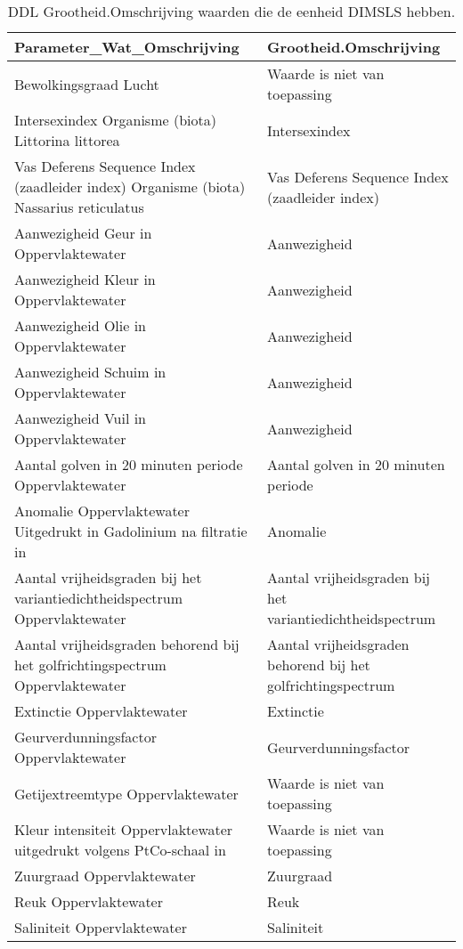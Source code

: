 \documentclass[
]{book}
\begin{document}
\begin{table}

\caption{\label{tab:DDL-DIMSLS}DDL Grootheid.Omschrijving waarden die de eenheid DIMSLS hebben. }
\centering
\begin{tabular}[t]{l|l}
\hline
Parameter\_Wat\_Omschrijving & Grootheid.Omschrijving\\
\hline
Bewolkingsgraad Lucht & Waarde is niet van toepassing\\
\hline
Intersexindex Organisme (biota) Littorina littorea & Intersexindex\\
\hline
Vas Deferens Sequence Index (zaadleider index) Organisme (biota) Nassarius reticulatus & Vas Deferens Sequence Index (zaadleider index)\\
\hline
Aanwezigheid Geur in Oppervlaktewater & Aanwezigheid\\
\hline
Aanwezigheid Kleur in Oppervlaktewater & Aanwezigheid\\
\hline
Aanwezigheid Olie in Oppervlaktewater & Aanwezigheid\\
\hline
Aanwezigheid Schuim in Oppervlaktewater & Aanwezigheid\\
\hline
Aanwezigheid Vuil in Oppervlaktewater & Aanwezigheid\\
\hline
Aantal golven in 20 minuten periode Oppervlaktewater & Aantal golven in 20 minuten periode\\
\hline
Anomalie Oppervlaktewater Uitgedrukt in Gadolinium na filtratie in & Anomalie\\
\hline
Aantal vrijheidsgraden bij het variantiedichtheidspectrum Oppervlaktewater & Aantal vrijheidsgraden bij het variantiedichtheidspectrum\\
\hline
Aantal vrijheidsgraden behorend bij het golfrichtingspectrum Oppervlaktewater & Aantal vrijheidsgraden behorend bij het golfrichtingspectrum\\
\hline
Extinctie Oppervlaktewater & Extinctie\\
\hline
Geurverdunningsfactor Oppervlaktewater & Geurverdunningsfactor\\
\hline
Getijextreemtype Oppervlaktewater & Waarde is niet van toepassing\\
\hline
Kleur intensiteit Oppervlaktewater uitgedrukt volgens PtCo-schaal in & Waarde is niet van toepassing\\
\hline
Zuurgraad Oppervlaktewater & Zuurgraad\\
\hline
Reuk Oppervlaktewater & Reuk\\
\hline
Saliniteit Oppervlaktewater & Saliniteit\\
\hline
\end{tabular}
\end{table}
\end{document}
